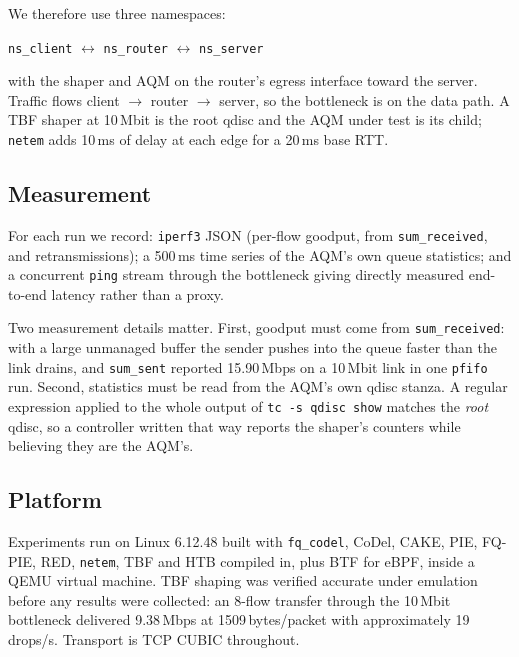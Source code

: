 \documentclass[conference]{IEEEtran}
\begin{document}
We therefore use three namespaces:

\begin{center}
\texttt{ns\_client} $\leftrightarrow$ \texttt{ns\_router} $\leftrightarrow$
\texttt{ns\_server}
\end{center}

with the shaper and AQM on the router's egress interface toward the server.
Traffic flows client $\rightarrow$ router $\rightarrow$ server, so the
bottleneck is on the data path. A TBF shaper at 10\,Mbit is the root qdisc and
the AQM under test is its child; \texttt{netem} adds 10\,ms of delay at each
edge for a 20\,ms base RTT.

\subsection{Measurement}

For each run we record: \texttt{iperf3} JSON (per-flow goodput, from
\texttt{sum\_received}, and retransmissions); a 500\,ms time series of the
AQM's own queue statistics; and a concurrent \texttt{ping} stream through the
bottleneck giving directly measured end-to-end latency rather than a proxy.

Two measurement details matter. First, goodput must come from
\texttt{sum\_received}: with a large unmanaged buffer the sender pushes into the
queue faster than the link drains, and \texttt{sum\_sent} reported 15.90\,Mbps
on a 10\,Mbit link in one \texttt{pfifo} run. Second, statistics must be read
from the AQM's own qdisc stanza. A regular expression applied to the whole
output of \texttt{tc -s qdisc show} matches the \emph{root} qdisc, so a
controller written that way reports the shaper's counters while believing they
are the AQM's.

\subsection{Platform}

Experiments run on Linux 6.12.48 built with \texttt{fq\_codel}, CoDel, CAKE,
PIE, FQ-PIE, RED, \texttt{netem}, TBF and HTB compiled in, plus BTF for eBPF,
inside a QEMU virtual machine. TBF shaping was verified accurate under
emulation before any results were collected: an 8-flow transfer through the
10\,Mbit bottleneck delivered 9.38\,Mbps at 1509\,bytes/packet with
approximately 19\,drops/s. Transport is TCP CUBIC \cite{cubic2008} throughout.

\end{document}
